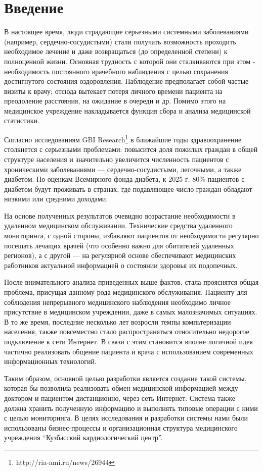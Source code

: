 \newpage 
\section*{Введение}
В настоящее время, люди страдающие серьезными системными заболеваниями
(например, сердечно-сосудистыми) стали получать возможность проходить необходимое лечение и даже возвращаться (до
определенной степени) к полноценной жизни. Основная трудность с которой они
сталкиваются при этом - необходимость постоянного врачебного наблюдения с целью
сохранения достигнутого состояния оздоровления. Наблюдение предполагает собой
частые визиты к врачу; отсюда вытекает потеря личного времени пациента на
преодоление расстояния, на ожидание в очереди и др. Помимо этого на медицинское
учреждение накладывается функция сбора и анализа медицинской статистики.

Согласно исследованиям GBI Research\footnote{ http://ria-ami.ru/news/26944 } в
ближайшие годы здравоохранение столкнется с серьезными проблемами: повысится
доля пожилых граждан в общей структуре населения и значительно увеличится
численность пациентов с хроническими заболеваниями — сердечно-сосудистыми,
легочными, а также диабетом. По оценкам Всемирного фонда диабета, к 2025 г. 80\%
пациентов с диабетом будут проживать в странах, где подавляющее число граждан
обладают низкими или средними доходами.

На основе полученных результатов очевидно возрастание необходимости в удаленном
медицинском обслуживании. Технические средства удаленного мониторинга, с одной
стороны, избавляют пациентов от необходимости регулярно посещать лечащих врачей
(что особенно важно для обитателей удаленных регионов), а с другой — на
регулярной основе обеспечивают медицинских работников актуальной информацией о
состоянии здоровья их подопечных.

После внимательного анализа приведенных выше фактов, стала прояснятся общая
проблема, присущая данному рода медицинского обслуживания. Пациенту для
соблюдения непрерывного медицинского наблюдения необходимо личное присутствие в
медицинском учреждении, даже в самых малозначимых ситуациях.
В то же время, последние  несколько лет возросли темпы компьтеризации населения,
также повсеместно стало  распространяться относительно недорогое подключение к
сети Интернет. В связи с этим становится вполне логичной идея частично
реализовать общение пациента и врача с использованием современных информационных
технологий.

Таким образом, основной целью разработки  является создание такой системы,
которая бы позволила реализовать обмен медицинской информацией между доктором и
пациентом дистанционно, через сеть Интернет. Система также должна хранить
полученную информацию и выполнять типовые операции с ними с целью мониторинга.
В целях исследования и разработки системы нами были использованы бизнес-процессы
и организационная структура медицинского учреждения “Кузбасский кардиологический
центр”.